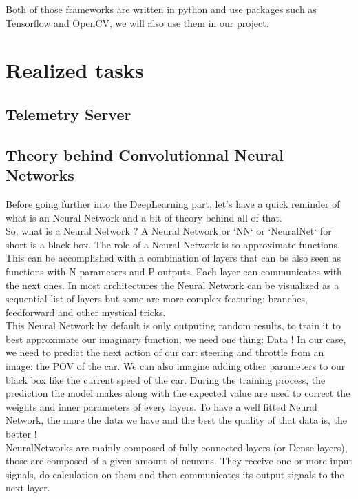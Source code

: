 \documentclass[12pt]{article}
\begin{document}
Both of those frameworks are written in python and use packages such as Tensorflow and OpenCV, we will also use them in our project.
\newpage



\section{Realized tasks}

\subsection{Telemetry Server}

\subsection{Theory behind Convolutionnal Neural Networks}
Before going further into the DeepLearning part, let's have a quick reminder of what is an Neural Network and a bit of theory behind all of that. \\

So, what is a Neural Network ? 
A Neural Network or `NN` or `NeuralNet` for short is a black box. The role of a Neural Network is to approximate functions. This can be accomplished with a combination of layers that can be also seen as functions with N parameters and P outputs. Each layer can communicates with the next ones. In most architectures the Neural Network can be visualized as a sequential list of layers but some are more complex featuring: branches, feedforward and other mystical tricks. \\

This Neural Network by default is only outputing random results, to train it to best approximate our imaginary function, we need one thing: Data ! In our case, we need to predict the next action of our car: steering and throttle from an image: the POV of the car. We can also imagine adding other parameters to our black box like the current speed of the car.
During the training process, the prediction the model makes along with the expected value are used to correct the weights and inner parameters of every layers. To have a well fitted Neural Network, the more the data we have and the best the quality of that data is, the better ! \\

NeuralNetworks are mainly composed of fully connected layers (or Dense layers), those are composed of a given amount of neurons. They receive one or more input signals, do calculation on them and then communicates its output signals to the next layer.\\
\end{document}

